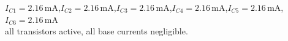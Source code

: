 \documentclass[11pt]{article}
\begin{document}
\begin{ansbox}
$I_{C1} = 2.16\,\mathrm{m}\mathrm{A}$,\quad $I_{C2} = 2.16\,\mathrm{m}\mathrm{A}$,\quad $I_{C3} = 2.16\,\mathrm{m}\mathrm{A}$,\quad $I_{C4} = 2.16\,\mathrm{m}\mathrm{A}$,\quad $I_{C5} = 2.16\,\mathrm{m}\mathrm{A}$,\quad $I_{C6} = 2.16\,\mathrm{m}\mathrm{A}$\\[2pt] all transistors active, all base currents negligible.
\end{ansbox}
\end{document}

